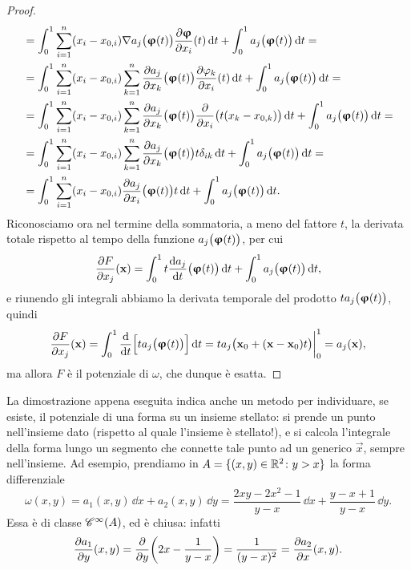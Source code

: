 \begin{proof}
\begin{equation}
\begin{split}
			&=\int_0^1\sum_{i=1}^n(x_i-x_{0,i})\grad a_j\big(\vphi(t)\big)\drp{\vphi}{x_i}(t)\,\dd t+\int_0^1a_j\big(\vphi(t)\big)\,\dd t=\\
			&=\int_0^1\sum_{i=1}^n(x_i-x_{0,i})\sum_{k=1}^n\drp{a_j}{x_k}\big(\vphi(t)\big)\drp{\phi_k}{x_i}(t)\,\dd t+\int_0^1a_j\big(\vphi(t)\big)\,\dd t=\\
			&=\int_0^1\sum_{i=1}^n(x_i-x_{0,i})\sum_{k=1}^n\drp{a_j}{x_k}\big(\vphi(t)\big)\drp{}{x_i}\big(t(x_k-x_{0,k})\big)\,\dd t+\int_0^1a_j\big(\vphi(t)\big)\,\dd t=\\
			&=\int_0^1\sum_{i=1}^n(x_i-x_{0,i})\sum_{k=1}^n\drp{a_j}{x_k}\big(\vphi(t)\big)t\delta_{ik}\,\dd t+\int_0^1a_j\big(\vphi(t)\big)\,\dd t=\\
			&=\int_0^1\sum_{i=1}^n(x_i-x_{0,i})\drp{a_j}{x_i}\big(\vphi(t)\big)t\,\dd t+\int_0^1a_j\big(\vphi(t)\big)\,\dd t.
		\end{split}
	\end{equation}
	Riconosciamo ora nel termine della sommatoria, a meno del fattore $t$, la derivata totale rispetto al tempo della funzione $a_j\big(\vphi(t)\big)$, per cui
	\begin{equation}
		\drp{F}{x_j}(\vec x)=\int_0^1t\drv{a_j}{t}\big(\vphi(t)\big)\,\dd t+\int_0^1a_j\big(\vphi(t)\big)\,\dd t,
	\end{equation}
	e riunendo gli integrali abbiamo la derivata temporale del prodotto $ta_j\big(\vphi(t)\big)$, quindi
	\begin{equation}
		\drp{F}{x_j}(\vec x)=\int_0^1\drv{}{t}\Big[ta_j\big(\vphi(t)\big)\Big]\,\dd t=ta_j\big(\vec x_0+(\vec x-\vec x_0)t\big)\bigg|_0^1=a_j(\vec x),
	\end{equation}
	ma allora $F$ è il potenziale di $\omega$, che dunque è esatta.
\end{proof}
La dimostrazione appena eseguita indica anche un metodo per individuare, se esiste, il potenziale di una forma su un insieme stellato: si prende un punto nell'insieme dato (rispetto al quale l'insieme è stellato!), e si calcola l'integrale della forma lungo un segmento che connette tale punto ad un generico $\vec x$, sempre nell'insieme.
Ad esempio, prendiamo in $A=\{(x,y)\in\R^2\colon y>x\}$ la forma differenziale
\begin{equation*}
	\omega(x,y)=a_1(x,y)\,\dd x+a_2(x,y)\,\dd y=\frac{2xy-2x^2-1}{y-x}\,\dd x+\frac{y-x+1}{y-x}\,\dd y.
\end{equation*}
Essa è di classe $\cont[\infty]{A}$, ed è chiusa: infatti
\begin{equation}
	\drp{a_1}{y}(x,y)=\drp{}{y}\bigg(2x-\frac1{y-x}\bigg)=\frac1{(y-x)^2}=\drp{a_2}{x}(x,y).
\end{equation}
